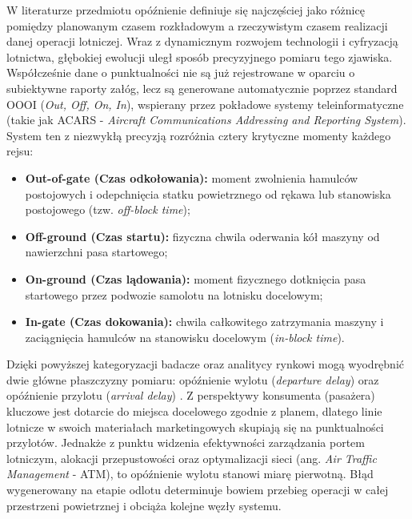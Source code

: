 W literaturze przedmiotu opóźnienie definiuje się najczęściej jako różnicę pomiędzy planowanym czasem rozkładowym a rzeczywistym czasem realizacji danej operacji lotniczej. Wraz z dynamicznym rozwojem technologii i cyfryzacją lotnictwa, głębokiej ewolucji uległ sposób precyzyjnego pomiaru tego zjawiska. Współcześnie dane o punktualności nie są już rejestrowane w oparciu o subiektywne raporty załóg, lecz są generowane automatycznie poprzez standard OOOI (\textit{Out, Off, On, In}), wspierany przez pokładowe systemy teleinformatyczne (takie jak ACARS - \textit{Aircraft Communications Addressing and Reporting System}). System ten z niezwykłą precyzją rozróżnia cztery krytyczne momenty każdego rejsu:
\begin{itemize}
    \item \textbf{Out-of-gate (Czas odkołowania):} moment zwolnienia hamulców postojowych i odepchnięcia statku powietrznego od rękawa lub stanowiska postojowego (tzw. \textit{off-block time});
    \item \textbf{Off-ground (Czas startu):} fizyczna chwila oderwania kół maszyny od nawierzchni pasa startowego;
    \item \textbf{On-ground (Czas lądowania):} moment fizycznego dotknięcia pasa startowego przez podwozie samolotu na lotnisku docelowym;
    \item \textbf{In-gate (Czas dokowania):} chwila całkowitego zatrzymania maszyny i zaciągnięcia hamulców na stanowisku docelowym (\textit{in-block time}).
\end{itemize}

Dzięki powyższej kategoryzacji badacze oraz analitycy rynkowi mogą wyodrębnić dwie główne płaszczyzny pomiaru: opóźnienie wylotu (\textit{departure delay}) oraz opóźnienie przylotu (\textit{arrival delay}) \cite{doganis}. Z perspektywy konsumenta (pasażera) kluczowe jest dotarcie do miejsca docelowego zgodnie z planem, dlatego linie lotnicze w swoich materiałach marketingowych skupiają się na punktualności przylotów. Jednakże z punktu widzenia efektywności zarządzania portem lotniczym, alokacji przepustowości oraz optymalizacji sieci (ang. \textit{Air Traffic Management} - ATM), to opóźnienie wylotu stanowi miarę pierwotną. Błąd wygenerowany na etapie odlotu determinuje bowiem przebieg operacji w całej przestrzeni powietrznej i obciąża kolejne węzły systemu.

